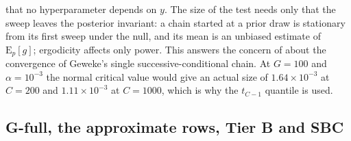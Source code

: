 that no hyperparameter depends on $y$.
The size of the test needs only that the sweep leaves the posterior invariant: a chain started at a
prior draw is stationary from its first sweep under the null, and its mean is an unbiased estimate of
$\mathrm{E}_p[g]$; ergodicity affects only power.
This answers the concern of \citet[Section~3]{talts2018validating} about the convergence of Geweke's
single successive-conditional chain.
At $G = 100$ and $\alpha = 10^{-3}$ the normal critical value would give an actual size of
$1.64\times10^{-3}$ at $C = 200$ and $1.11\times10^{-3}$ at $C = 1000$, which is why the $t_{C-1}$
quantile is used.

\subsection{G-full, the approximate rows, Tier B and SBC}\label{app:sbc}

